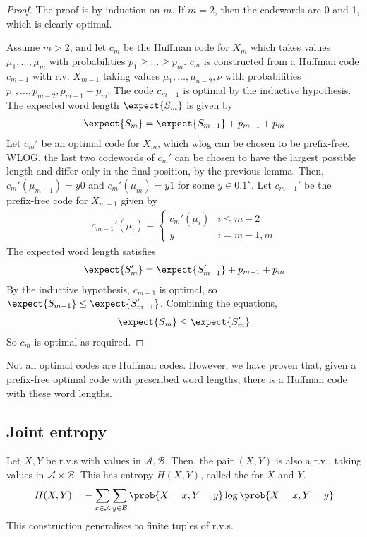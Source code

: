 \begin{proof}
    The proof is by induction on $m$.
    If $m = 2$, then the codewords are 0 and 1, which is clearly optimal.

    Assume $m > 2$, and let $c_m$ be the Huffman code for $X_m$ which takes values $\mu_1, \dots, \mu_m$ with probabilities $p_1 \geq \dots \geq p_m$.
    $c_m$ is constructed from a Huffman code $c_{m-1}$ with r.v. $X_{m-1}$ taking values $\mu_1, \dots, \mu_{n-2}, \nu$ with probabilities $p_1, \dots, p_{m-2}, p_{m-1} + p_m$.
    The code $c_{m-1}$ is optimal by the inductive hypothesis.
    The expected word length $\expect{S_m}$ is given by
    \begin{align*}
        \expect{S_m} = \expect{S_{m-1}} + p_{m-1} + p_m
    \end{align*}
    Let $c_m'$ be an optimal code for $X_m$, which wlog can be chosen to be prefix-free.
    WLOG, the last two codewords of $c_m'$ can be chosen to have the largest possible length and differ only in the final position, by the previous lemma.
    Then, $c_m'(\mu_{m-1}) = y 0$ and $c_m'(\mu_m) = y 1$ for some $y \in \qty{0,1}^\star$.
    Let $c_{m-1}'$ be the prefix-free code for $X_{m-1}$ given by
    \begin{align*}
        c_{m-1}'(\mu_i) = \begin{cases}
        c_m'(\mu_i) & i \leq m-2 \\
        y & i = m-1, m
    \end{cases}
    \end{align*}
    The expected word length satisfies
    \begin{align*}
        \expect{S_m'} = \expect{S_{m-1}'} + p_{m-1} + p_m
    \end{align*}
    By the inductive hypothesis, $c_{m-1}$ is optimal, so $\expect{S_{m-1}} \leq \expect{S_{m-1}'}$.
    Combining the equations,
    \begin{align*}
        \expect{S_m} \leq \expect{S_m'}
    \end{align*}
    So $c_m$ is optimal as required.
\end{proof}

\begin{remark}
    Not all optimal codes are Huffman codes.
    However, we have proven that, given a prefix-free optimal code with prescribed word lengths, there is a Huffman code with these word lengths.
\end{remark}

\subsection{Joint entropy}
Let $X, Y$ be r.v.s with values in $\mathcal A, \mathcal B$.
Then, the pair $(X, Y)$ is also a r.v., taking values in $\mathcal A \times \mathcal B$.
This has entropy $H(X,Y)$, called the  for $X$ and $Y$.
\begin{align*}
    H(X,Y) = - \sum_{x \in \mathcal A} \sum_{y \in \mathcal B} \prob{X = x, Y = y} \log \prob{X = x, Y = y}
\end{align*}
This construction generalises to finite tuples of r.v.s.

